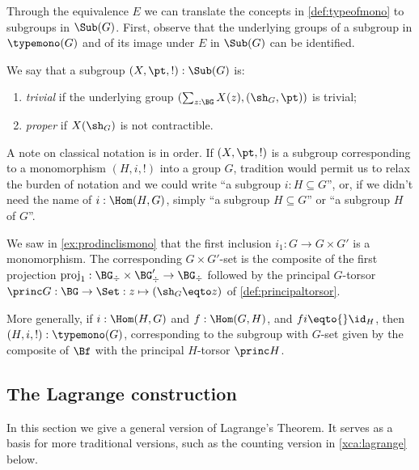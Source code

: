 Through the equivalence $E$ we can translate the concepts in
\cref{def:typeofmono} to subgroups in $\Sub(G)$. 
First, observe that the underlying groups of a subgroup in $\typemono(G)$
and of its image under $E$ in $\Sub(G)$ can be identified.

\begin{definition}\label{def:triv-proper-Mono}
We say that a subgroup $(X,\pt,!):\Sub(G)$ is:
      \begin{enumerate}
      \item \emph{trivial} if the underlying group
      $(\sum_{z:\BG}X(z),(\sh_G,\pt))$ is trivial;
      \item \emph{proper} if $X(\sh_G)$ is not
      contractible.\qedhere
      \end{enumerate}
\end{definition}
      
\begin{remark}\label{rem:notationsubgroup}
      A note on classical notation is in order.
If $(X,\pt,!)$ is a subgroup corresponding to a monomorphism $(H,i,!)$ into a group $G$, tradition would permit us to relax the burden of notation and we could write ``a subgroup $i:H\subseteq G$'', or, if we didn't need the name of $i:\Hom(H,G)$, simply ``a subgroup $H\subseteq G$'' or ``a subgroup $H$ of $G$''.
    \end{remark}
    
\begin{example}
  \label{ex:prodinclisGset}
  We saw in \cref{ex:prodinclismono} that the first 
  inclusion $i_1:G\to G\times G'$ is a monomorphism.
  The corresponding $G\times G'$-set is the composite of the first projection
  $\mathrm{proj}_1:\BG_\div\times\BG'_\div\to \BG_\div$ followed by the
  principal $G$-torsor $\princ G:\BG\to\Set: z\mapsto (\sh_G\eqto z)$ 
  of \cref{def:principaltorsor}.

  More generally, if $i:\Hom(H,G)$ and $f:\Hom(G,H)$, and $fi\eqto{}\id_H$,
  then $(H,i,!):\typemono(G)$, corresponding to the subgroup with $G$-set 
  given by the composite of $\Bf$ with the principal $H$-torsor $\princ H$.
\end{example}
    
    
\subsection{The Lagrange construction}

In this section we give a general version of Lagrange's Theorem.
It serves as a basis for more traditional versions, such as the
counting version in \cref{xca:lagrange} below.

